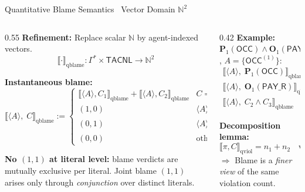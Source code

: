 \documentclass[9pt,aspectratio=169]{beamer}
\newcommand{\logic}[1]{\ensuremath{\mathsf{#1}}\xspace}
\newcommand{\cDL}{\logic{TACNL}}
\newcommand{\obl}[2][]{\mathbf{O}_{#1}(#2)}
\newcommand{\perm}[2][]{\mathbf{P}_{#1}(#2)}
\newcommand{\trace}[1]{\ensuremath{\langle #1 \rangle}\xspace}
\newcommand{\bottp}[1]{\mathbin{\bot^{t}_{#1}}}
\newcommand{\qsem}[1]{\llbracket #1 \rrbracket_{\text{qviol}}}
\newcommand{\qblame}[1]{\llbracket #1 \rrbracket_{\text{qblame}}}
\newcommand{\LH}{\ensuremath{\mathsf{LH}}}
\newcommand{\PAY}{\ensuremath{\mathsf{PAY\_R}}\xspace}
\newcommand{\OCC}{\ensuremath{\mathsf{OCC}}\xspace}
\begin{document}
\begin{frame}{Quantitative Blame Semantics \textemdash\ Vector Domain $\mathbb{N}^2$}
\small
\begin{columns}[T]
\begin{column}{0.55\textwidth}
  \textbf{Refinement:} Replace scalar $\mathbb{N}$ by agent-indexed vectors.
  \[
  \qblame{\cdot} : \Gamma^* \times \cDL \to \mathbb{N}^2
  \]

  \textbf{Instantaneous blame:}
  \[
  \qblame{\trace{A},\;C} :=
  \begin{cases}
    \qblame{\trace{A},C_1} + \qblame{\trace{A},C_2} & C = C_1 \wedge C_2\\[4pt]
    (1,0) & \trace{A} \vDash_{\bottp{1}} \LH(C)\\
    (0,1) & \trace{A} \vDash_{\bottp{2}} \LH(C)\\
    (0,0) & \text{otherwise}
  \end{cases}
  \]

  \textbf{No $(1,1)$ at literal level:} blame verdicts are mutually exclusive per literal.
  Joint blame $(1,1)$ arises only through \emph{conjunction} over distinct literals.
\end{column}
\begin{column}{0.42\textwidth}
  \textbf{Example:} $\perm[1]{\OCC} \wedge \obl[1]{\PAY}$,
  $A = \{\OCC^{(1)}\}$:
  \begin{align*}
    \qblame{\trace{A},\;\perm[1]{\OCC}} &= (0,1)\\
    \qblame{\trace{A},\;\obl[1]{\PAY}} &= (1,0)\\
    \qblame{\trace{A},\;C_2 \wedge C_3} &= (1,1)
  \end{align*}

  \vspace{2mm}
  \textbf{Decomposition lemma:}
  \[
  \qsem{\pi,C} = n_1 + n_2
  \quad\text{where}\quad
  \qblame{\pi,C} = (n_1,n_2)
  \]
  $\Rightarrow$ Blame is a \emph{finer view} of the same violation count.
\end{column}
\end{columns}
\end{frame}
\end{document}
